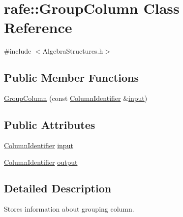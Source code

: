 \hypertarget{classrafe_1_1_group_column}{\section{rafe\+:\+:Group\+Column Class Reference}
\label{classrafe_1_1_group_column}
}


{\ttfamily \#include $<$Algebra\+Structures.\+h$>$}

\subsection*{Public Member Functions}
\begin{DoxyCompactItemize}
\item 
\hyperlink{classrafe_1_1_group_column_a003ad2331840ea07845a042ca9240970}{Group\+Column} (const \hyperlink{classrafe_1_1_column_identifier}{Column\+Identifier} \&\hyperlink{classrafe_1_1_group_column_a66b2532a7d69ddab17aae9c969927448}{input})
\end{DoxyCompactItemize}
\subsection*{Public Attributes}
\begin{DoxyCompactItemize}
\item 
\hyperlink{classrafe_1_1_column_identifier}{Column\+Identifier} \hyperlink{classrafe_1_1_group_column_a66b2532a7d69ddab17aae9c969927448}{input}
\item 
\hyperlink{classrafe_1_1_column_identifier}{Column\+Identifier} \hyperlink{classrafe_1_1_group_column_a830dc7de4321328cc1aba736ca0e82fe}{output}
\end{DoxyCompactItemize}


\subsection{Detailed Description}
Stores information about grouping column. 

